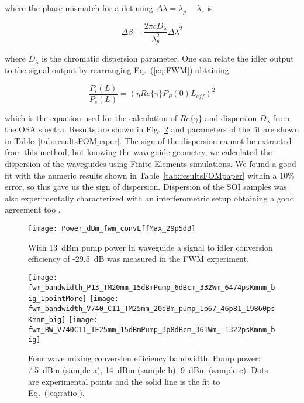 where the phase mismatch for a detuning $ \Delta\lambda = \lambda_p-\lambda_s$ is

\begin{equation}
        \Delta \beta=\frac{2\pi cD_\lambda}{\lambda_p^2}\Delta\lambda^2
\end{equation}

where $D_\lambda$ is the chromatic dispersion parameter. One can relate the idler output to the signal output by rearranging Eq.~(\ref{eq:FWM}) obtaining

\begin{equation}
        \frac{P_i(L)}{P_s(L)}=(\eta Re\{\gamma\}P_P(0)L_{eff})^2 
\label{eq:ratio}
\end{equation}

which is the equation used for the calculation of $Re\{\gamma\}$ and dispersion $D_\lambda$ from the OSA spectra. Results are shown in Fig.~\ref{fig:fwmBw} and parameters of the fit are shown in Table~\ref{tab:resultsFOMpaper}.
The sign of the dispersion cannot be extracted from this method, but knowing the waveguide geometry, we calculated the dispersion of the waveguides using Finite Elements simulations.
We found a good fit with the numeric results shown in Table~\ref{tab:resultsFOMpaper} within a 10\% error, so this gave us the sign of dispersion. Dispersion of the SOI samples was also experimentally characterized with an interferometric setup obtaining a good agreement too \cite{Mas2012}.




\begin{figure}[htb]
    \centering
    \texttt{[image: Power\_dBm\_fwm\_convEffMax\_29p5dB]}
    \caption{With 13~dBm pump power in waveguide a signal to idler conversion efficiency of -29.5~dB was measured in the FWM experiment.}
    \label{fig:fwmOSA}
\end{figure}

\begin{figure}[htb]
    \centering
    \texttt{[image: fwm\_bandwidth\_P13\_TM20mm\_15dBmPump\_6dBcm\_332Wm\_6474psKmnm\_big\_1pointMore]}
    \texttt{[image: fwm\_bandwidth\_V740\_C11\_TM25mm\_20dBm\_pump\_1p67\_46p81\_19860psKmnm\_big]}
    \texttt{[image: fwm\_BW\_V740C11\_TE25mm\_15dBmPump\_3p8dBcm\_361Wm\_-1322psKmnm\_big]}
    \caption{Four wave mixing conversion efficiency bandwidth. Pump power: 7.5~dBm (sample a), 14~dBm (sample b), 9~dBm (sample c). Dots are experimental points and the solid line is the fit to Eq.~(\ref{eq:ratio}).}
    \label{fig:fwmBw}
\end{figure}

